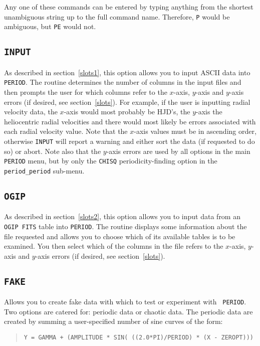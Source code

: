 Any one of these commands can be entered by typing anything from the shortest
unambiguous string up to the full command name. Therefore, {\tt P} would be
ambiguous, but {\tt PE} would not.

\subsection*{\tt INPUT}

As described in section~\ref{slots1}, this option allows you to input
ASCII data into {\tt PERIOD}. The routine determines the number of
columns in the input files and then prompts the user for which columns
refer to the $x$-axis, $y$-axis and $y$-axis errors (if desired, see
section~\ref{slots}). For example, if the user is inputting radial
velocity data, the $x$-axis would most probably be HJD's, the $y$-axis
the heliocentric radial velocities and there would most likely be
errors associated with each radial velocity value. Note that the
$x$-axis values must be in ascending order, otherwise {\tt INPUT} will
report a warning and either sort the data (if requested to do so) or
abort.  Note also that the $y$-axis errors are used by all options in
the main {\tt PERIOD} menu, but by only the {\tt CHISQ}
periodicity-finding option in the {\tt period\_period} sub-menu.

\subsection*{\tt OGIP}

As described in section~\ref{slots2}, this option allows you to input data
from an {\tt OGIP FITS} table 
into {\tt PERIOD}. The routine displays some information about
the file requested and allows you to choose which of its available 
tables is to be examined. You then select which of the columns in the file 
refers to the $x$-axis,
$y$-axis and $y$-axis errors (if desired, see section~\ref{slots}). 

\subsection*{\tt FAKE}

Allows you to create fake data with which to test or experiment with {\tt
PERIOD}. Two options are catered for: periodic data or chaotic data. The
periodic data are created by summing a user-specified number of sine curves of
the form: 

\begin{quote}
{\tt Y = GAMMA + (AMPLITUDE * SIN( ((2.0*PI)/PERIOD) * (X - ZEROPT)))}
\end{quote}

